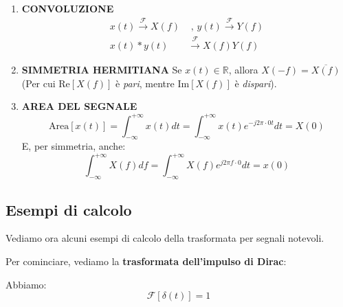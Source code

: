 \begin{prop}
\begin{enumerate}
\[\begin{aligned}
                    x(t)\cos (2\pi f_{0}t) &\overset{\mathcal{F}}{ \longrightarrow }
                    \frac{1}{2} [ X(f-f_{0}) + X(f+f_{0}) ]
                \end{aligned}
            \]
            Con seno:
            \[
                \begin{aligned}
                    x(t) &\overset{\mathcal{F}}{ \longrightarrow } X(f) \\ 
                    x(t)\sin (2\pi f_{0}t) &\overset{\mathcal{F}}{ \longrightarrow }
                    \frac{1}{2j} [ X(f-f_{0}) - X(f+f_{0}) ]
                \end{aligned}
            \]
        \item \textbf{CONVOLUZIONE}
            \[
                \begin{aligned}
                    x(t) \overset{\mathcal{F}}{ \longrightarrow } X(f) &\text{ , }
                    y(t) \overset{\mathcal{F}}{ \longrightarrow } Y(f) \\ 
                    x(t) \ast y(t) &\overset{\mathcal{F}}{ \longrightarrow } X(f)Y(f)
                \end{aligned}
            \]
        \item \textbf{SIMMETRIA HERMITIANA} Se $x(t)\in \mathbb{R}$, allora 
            $X(-f)=\overline{X(f)}$ (Per cui $\text{Re}[X(f)]$ è \textit{pari}, mentre
            $\text{Im}[X(f)]$ è \textit{dispari}). 
        \item \textbf{AREA DEL SEGNALE}
            \[
                \text{Area}[x(t)] = \int_{-\infty}^{+\infty} x(t) dt = 
                \int_{-\infty}^{+\infty} x(t) e^{-j 2\pi\cdot 0t}dt = X(0) 
            \]
            E, per simmetria, anche:
            \[
                \int_{-\infty}^{+\infty} X(f) df = \int_{-\infty}^{+\infty} X(f) e^{j 2\pi f\cdot 0} dt 
                = x(0)
            \] 
    \end{enumerate}
\end{prop}

\subsection{Esempi di calcolo}

Vediamo ora alcuni esempi di calcolo della trasformata per segnali notevoli.

Per cominciare, vediamo la \textbf{trasformata dell'impulso di Dirac}:

\begin{prop}
    Abbiamo:
    \[
        \mathcal{F}[\delta(t)] = 1
    \] 
\end{prop}

